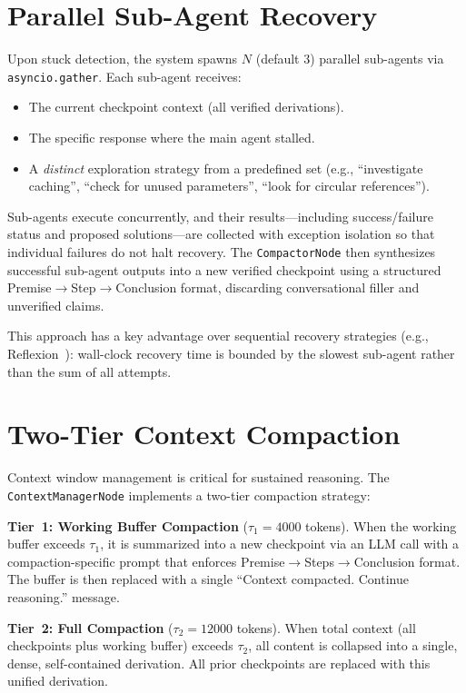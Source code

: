\documentclass[conference]{IEEEtran}
\begin{document}
\section{Parallel Sub-Agent Recovery}
\label{sec:subagent}

Upon stuck detection, the system spawns $N$ (default 3) parallel sub-agents via \texttt{asyncio.gather}. Each sub-agent receives:
\begin{itemize}
    \item The current checkpoint context (all verified derivations).
    \item The specific response where the main agent stalled.
    \item A \emph{distinct} exploration strategy from a predefined set (e.g., ``investigate caching'', ``check for unused parameters'', ``look for circular references'').
\end{itemize}

Sub-agents execute concurrently, and their results---including success/failure status and proposed solutions---are collected with exception isolation so that individual failures do not halt recovery. The \texttt{CompactorNode} then synthesizes successful sub-agent outputs into a new verified checkpoint using a structured Premise$\rightarrow$Step$\rightarrow$Conclusion format, discarding conversational filler and unverified claims.

This approach has a key advantage over sequential recovery strategies (e.g., Reflexion~\cite{shinn2023reflexion}): wall-clock recovery time is bounded by the slowest sub-agent rather than the sum of all attempts.

\section{Two-Tier Context Compaction}
\label{sec:compaction}

Context window management is critical for sustained reasoning. The \texttt{ContextManagerNode} implements a two-tier compaction strategy:

\textbf{Tier~1: Working Buffer Compaction} ($\tau_1 = 4000$ tokens). When the working buffer exceeds $\tau_1$, it is summarized into a new checkpoint via an LLM call with a compaction-specific prompt that enforces Premise$\rightarrow$Steps$\rightarrow$Conclusion format. The buffer is then replaced with a single ``Context compacted. Continue reasoning.'' message.

\textbf{Tier~2: Full Compaction} ($\tau_2 = 12000$ tokens). When total context (all checkpoints plus working buffer) exceeds $\tau_2$, all content is collapsed into a single, dense, self-contained derivation. All prior checkpoints are replaced with this unified derivation.
\end{document}
